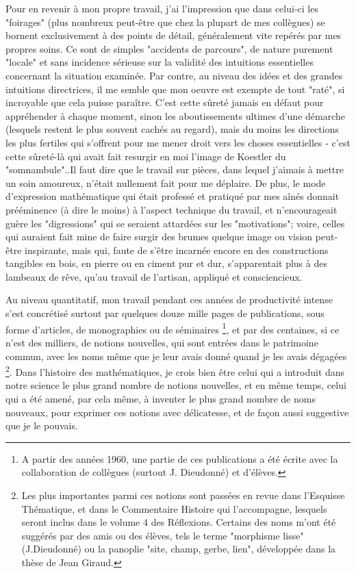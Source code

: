 {Pour en revenir à mon propre travail, j'ai l'impression que dans celui-ci les "foirages" (plus nombreux peut-être que chez la plupart de mes collègues) se bornent exclusivement à des points de détail, généralement vite repérés par mes propres soins. Ce sont de simples "accidents de parcours", de nature purement "locale" et sans incidence sérieuse sur la validité des intuitions essentielles concernant la situation examinée. Par contre, au niveau des idées et des grandes intuitions directrices, il me semble que mon oeuvre est exempte de tout "raté", si incroyable que cela puisse paraître. C’est cette sûreté jamais en défaut pour appréhender à chaque moment, sinon les aboutissements ultimes d'une démarche (lesquels restent le plus souvent cachés au regard), mais du moins les directions les plus fertiles qui s'offrent pour me mener droit vers les choses essentielles - c'est cette sûreté-là qui avait fait resurgir en moi l'image de Koestler du "somnambule".}.Il faut dire que le travail sur pièces, dans lequel j’aimais à mettre un soin amoureux, n'était nullement fait pour me déplaire. De plus, le mode d'expression mathématique qui était professé et pratiqué par mes aînés donnait prééminence (à dire le moins) à l'aspect technique du travail, et n'encourageait guère les "digressions" qui se seraient attardées sur les "motivations"; voire, celles qui auraient fait mine de faire surgir des brumes quelque image ou vision peut-être inspirante, mais qui, faute de s'être incarnée encore en des constructions tangibles en bois, en pierre ou en ciment pur et dur, s'apparentait plus à des lambeaux de rêve, qu'au travail de l'artisan, appliqué et consciencieux.

Au niveau quantitatif, mon travail pendant ces années de productivité intense s'est concrétisé surtout par quelques douze mille pages de publications, sous forme d'articles, de monographies ou de séminaires \footnote{A partir des années 1960, une partie de ces publications a été écrite avec la collaboration de collègues (surtout J. Dieudonné) et d'élèves.}, et par des centaines, si ce n'est des milliers, de notions nouvelles, qui sont entrées dans le patrimoine commun, avec les noms même que je leur avais donné quand je les avais dégagées \footnote{Les plus importantes parmi ces notions sont passées en revue dans l'Esquisse Thématique, et dans le Commentaire Histoire qui l'accompagne, lesquels seront inclus dans le volume 4 des Réflexions. Certains des noms m'ont été suggérés par des amis ou des élèves, tels le terme "morphisme lisse" (J.Dieudonné) ou la panoplie "site, champ, gerbe, lien", développée dans la thèse de Jean Giraud.}. Dans l'histoire des mathématiques, je crois bien être celui qui a introduit dans notre science le plus grand nombre de notions nouvelles, et en même temps, celui qui a été amené, par cela même, à inventer le plus grand nombre de noms nouveaux, pour exprimer ces notions avec délicatesse, et de façon aussi suggestive que je le pouvais.


